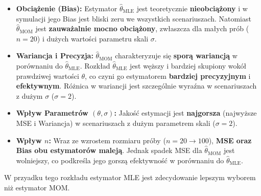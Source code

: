 \documentclass[a4paper,12pt]{article}
\begin{document}
    \begin{itemize}
        \item \textbf{Obciążenie (Bias):}
        Estymator $\hat{\theta}_{\text{MLE}}$ jest teoretycznie \textbf{nieobciążony} 
        i w symulacji jego Bias jest bliski zeru we wszystkich scenariuszach. Natomiast $\hat{\theta}_{\text{MOM}}$ jest 
        \textbf{zauważalnie mocno obciążony}, zwłaszcza dla małych prób ($n=20$) i dużych wartości parametru skali $\sigma$.
        
        \item \textbf{Wariancja i Precyzja:}
        $\hat{\theta}_{\text{MOM}}$ charakteryzuje się \textbf{sporą wariancją} w porównaniu do $\hat{\theta}_{\text{MLE}}$. 
        Rozkład $\hat{\theta}_{\text{MLE}}$ jest węższy i bardziej skupiony wokół prawdziwej wartości $\theta$, co czyni go estymatorem 
        \textbf{bardziej precyzyjnym} i \textbf{efektywnym}.
        Różnica w wariancji jest szczególnie wyraźna w scenariuszach z dużym $\sigma$ ($\sigma=2$).
        
        \item \textbf{Wpływ Parametrów $(\theta, \sigma)$:}
        Jakość estymacji jest \textbf{najgorsza} (najwyższe MSE i Wariancja) w scenariuszach z dużym parametrem skali ($\sigma=2$). 

        \item \textbf{Wpływ $n$:}
        Wraz ze wzrostem rozmiaru próby ($n=20 \to 100$), \textbf{MSE oraz Bias obu estymatorów maleją}.
        Jednak spadek MSE dla $\hat{\theta}_{\text{MOM}}$ jest wolniejszy, 
        co podkreśla jego gorszą efektywność w porównaniu do $\hat{\theta}_{\text{MLE}}$.
    \end{itemize}

    W przyadku tego rozkładu estymator MLE jest zdecydowanie lepszym wyborem niż estymator MOM.
\end{document}
